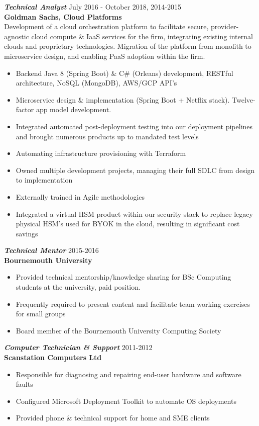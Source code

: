 \documentclass[margin, 10pt]{res} %
\begin{document}
\begin{resume}
{\sl \textbf{Technical Analyst}} \hfill July 2016 - October 2018, 2014-2015 \\
\textbf{Goldman Sachs, Cloud Platforms} \\
Development of a cloud orchestration platform to facilitate secure, provider-agnostic cloud compute \& IaaS services for the firm, integrating existing internal clouds and proprietary technologies. Migration of the platform from monolith to microservice design, and enabling PaaS adoption within the firm.
\begin{itemize}
\item Backend Java 8 (Spring Boot) \& C\# (Orleans) development, \newline RESTful architecture, NoSQL (MongoDB), AWS/GCP API’s
\item Microservice design \& implementation (Spring Boot + Netflix stack). Twelve-factor app model development.
\item Integrated automated post-deployment testing into our  deployment pipelines and brought numerous products up to mandated test levels
\item Automating infrastructure provisioning with Terraform
\item Owned multiple development projects, managing their full SDLC from design to implementation
\item Externally trained in Agile methodologies
\item Integrated a virtual HSM product within our security stack to replace legacy physical HSM’s used for BYOK in the cloud, resulting in significant cost savings
\end{itemize} 

{\sl \textbf{Technical Mentor}} \hfill 2015-2016 \\
\textbf{Bournemouth University}
\begin{itemize}
\item Provided technical mentorship/knowledge sharing for BSc Computing students at the university, paid position.
\item Frequently required to present content and facilitate team working exercises for small groups
\item Board member of the Bournemouth University Computing Society
\end{itemize}


\pagebreak %


{\sl \textbf{Computer Technician \& Support}} \hfill 2011-2012 \\
\textbf{Scanstation Computers Ltd}
\begin{itemize}
\item Responsible for diagnosing and repairing end-user hardware and software faults
\item Configured Microsoft Deployment Toolkit to automate OS deployments
\item Provided phone \& technical support for home and SME clients
\end{itemize}
 

\end{resume}
\end{document}

